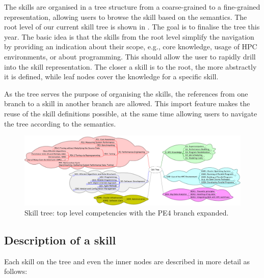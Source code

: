 \documentclass[jocse]{jocseart}
\begin{document}
The skills are organised in a tree structure from a coarse-grained to a fine-grained representation, allowing users to browse the skill based on the semantics.
The root level of our current skill tree is shown in . The goal is to finalise the tree this year.
The basic idea is that the skills from the root level simplify the navigation by providing an indication about their scope, e.g., core knowledge, usage of HPC environments, or about programming.
This should allow the user to rapidly drill into the skill representation.
The closer a skill is to the root, the more abstractly it is defined, while leaf nodes cover the knowledge for a specific skill.

As the tree serves the purpose of organising the skills, the references from one branch to a skill in another branch are allowed.
This import feature makes the reuse of the skill definitions possible, at the same time allowing users to navigate the tree according to the semantics.

\begin{figure}[tb!]
	\centering
	\includegraphics[width=15.0cm]{skill-tree}
	\caption{Skill tree: top level competencies with the PE4 branch expanded.}
	\label{fig:skill-tree}
\end{figure}

\subsection{Description of a skill}

Each skill on the tree and even the inner nodes are described in more detail as follows:
\end{document}
